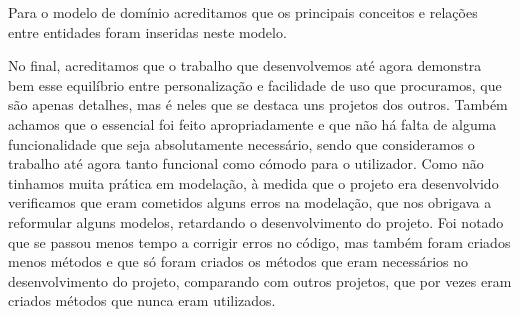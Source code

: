 \documentclass[10pt, a4paper]{article}
\begin{document}
Para o modelo de domínio acreditamos que os principais conceitos e relações entre entidades foram inseridas neste modelo.

No final, acreditamos que o trabalho que desenvolvemos até agora demonstra bem esse equilíbrio entre personalização e facilidade de uso que procuramos, que são apenas detalhes, mas é neles que se destaca uns projetos dos outros. Também achamos que o essencial foi feito apropriadamente e que não há falta de alguma funcionalidade que seja absolutamente necessário, sendo que consideramos o trabalho até agora tanto funcional como cómodo para o utilizador. Como não tinhamos muita prática em modelação, à medida que o projeto era desenvolvido verificamos que eram cometidos alguns erros na modelação, que nos obrigava a reformular alguns modelos, retardando o desenvolvimento do projeto. Foi notado que se passou menos tempo a corrigir erros no código, mas também foram criados menos métodos e que só foram criados os métodos que eram necessários no desenvolvimento do projeto, comparando com outros projetos, que por vezes eram criados métodos que nunca eram utilizados.
\end{document}
